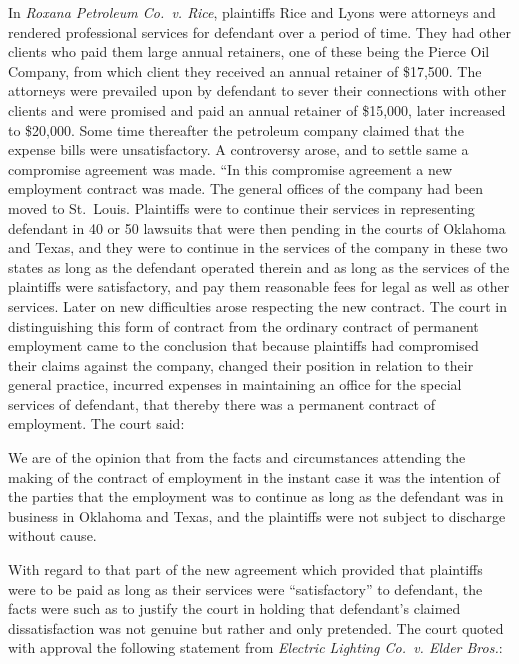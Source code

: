 \documentclass[
  letterpaper,
  11pt,
  DIV=9,
  openright]{scrbook}
\renewenvironment{quote}{
  \list{}{\leftmargin=2em\rightmargin=2em}
  \item\relax\small
}
{\endlist}
\begin{document}
In \emph{Roxana Petroleum Co.~v. Rice}, plaintiffs Rice and Lyons were
attorneys and rendered professional services for defendant over a period
of time. They had other clients who paid them large annual retainers,
one of these being the Pierce Oil Company, from which client they
received an annual retainer of \$17,500. The attorneys were prevailed
upon by defendant to sever their connections with other clients and were
promised and paid an annual retainer of \$15,000, later increased to
\$20,000. Some time thereafter the petroleum company claimed that the
expense bills were unsatisfactory. A controversy arose, and to settle
same a compromise agreement was made. ``In this compromise agreement a
new employment contract was made. The general offices of the company had
been moved to St.~Louis. Plaintiffs were to continue their services in
representing defendant in 40 or 50 lawsuits that were then pending in
the courts of Oklahoma and Texas, and they were to continue in the
services of the company in these two states as long as the defendant
operated therein and as long as the services of the plaintiffs were
satisfactory, and pay them reasonable fees for legal as well as other
services. Later on new difficulties arose respecting the new contract.
The court in distinguishing this form of contract from the ordinary
contract of permanent employment came to the conclusion that because
plaintiffs had compromised their claims against the company, changed
their position in relation to their general practice, incurred expenses
in maintaining an office for the special services of defendant, that
thereby there was a permanent contract of employment. The court said:

\begin{quote}
We are of the opinion that from the facts and circumstances attending
the making of the contract of employment in the instant case it was the
intention of the parties that the employment was to continue as long as
the defendant was in business in Oklahoma and Texas, and the plaintiffs
were not subject to discharge without cause.
\end{quote}

With regard to that part of the new agreement which provided that
plaintiffs were to be paid as long as their services were
``satisfactory'' to defendant, the facts were such as to justify the
court in holding that defendant's claimed dissatisfaction was not
genuine but rather and only pretended. The court quoted with approval
the following statement from \emph{Electric Lighting Co.~v. Elder
Bros.}:
\end{document}

